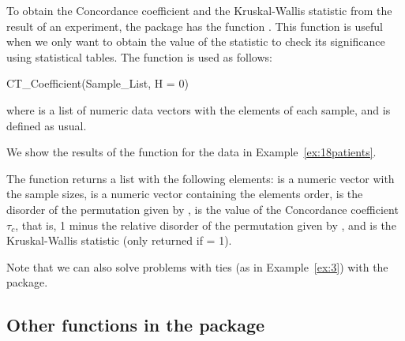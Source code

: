 To obtain the Concordance coefficient and the Kruskal-Wallis statistic from the result of an experiment, the  package has the function . This function is useful when we only want to obtain the value of the statistic to check its significance using statistical tables. The function  is used as follows:
\begin{example}
CT_Coefficient(Sample_List, H = 0)
\end{example}
where  is a list of numeric data vectors with the elements of each sample, and  is defined as usual.

\setcounter{exmp}{1}
\begin{exmp}[Cont.] 
We show the results of the function  for the data in Example~\ref{ex:18patients}.
\end{exmp}


The function  returns a list with the following elements:  is a numeric vector with the sample sizes,  is a numeric vector containing the elements order,  is the disorder of the permutation given by ,  is the value of the Concordance coefficient $\tau_c$, that is, 1 minus the relative disorder of the permutation given by , and  is the Kruskal-Wallis statistic (only returned if  = 1).

Note that we can also solve problems with ties (as in Example~\ref{ex:3}) with the  package.

\subsection{Other functions in the  package}

